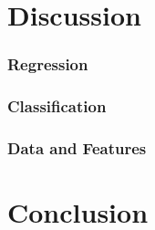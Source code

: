 \chapter{Discussion}
\subsection{Regression}
\subsection{Classification}
\subsection{Data and Features}

\chapter{Conclusion}
